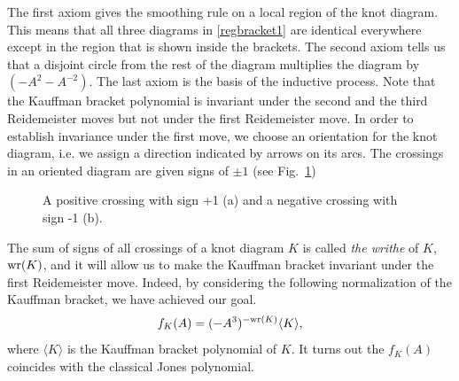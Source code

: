 The first axiom gives the smoothing rule on a local region of the knot diagram. This means that  all three diagrams in \ref{regbracket1} are identical everywhere except in the region that is shown inside the brackets. The second axiom tells us that a disjoint circle from the rest of the diagram multiplies the diagram by $(-A^2 - A^{-2})$. The last axiom is the basis of the inductive process. Note that the Kauffman bracket polynomial is invariant under the second and the third Reidemeister moves but not under the first Reidemeister move. In order to establish invariance under the first move,  we choose an orientation for the knot diagram, i.e. we assign a direction indicated by arrows on its arcs. The crossings in an oriented diagram are given signs of $\pm 1$ (see Fig.~\ref{crossings})

\begin{figure}[h]
\centering
{}   \hspace{3cm}
\caption{A positive crossing with sign +1 (a) and a negative crossing with sign -1 (b).}\label{crossings}
\end{figure}

The sum of signs of all crossings of a knot diagram $K$ is called {\it the writhe} of $K$, ${\rm wr}(K)$, and it will allow us to make the Kauffman bracket invariant under the first Reidemeister move. Indeed, by considering the following normalization of the Kauffman bracket,  we have achieved our goal.
\begin{equation}\label{jones}
f_K(A) = (-A^3)^{- {\rm wr}(K)} \langle K \rangle,
\end{equation}
where $\langle K \rangle$ is the Kauffman bracket polynomial of $K$. It turns out the $f_K(A)$ coincides with the classical Jones polynomial.

